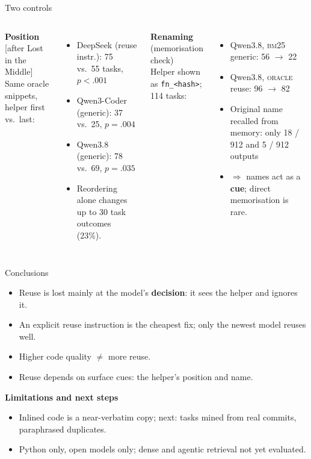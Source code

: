 \documentclass[aspectratio=169,11pt]{beamer}
\newcommand{\venue}[1]{{\scriptsize\color{gray}[#1]}}
\begin{document}
\begin{frame}{Two controls}
  \begin{columns}[T]
    \textbf{Position} \venue{after Lost in the Middle}\\[0.3em]
    {\small Same oracle snippets, helper first vs.\ last:}
    \begin{itemize}\small
      \item DeepSeek (reuse instr.): 75 vs.\ 55 tasks, $p<.001$
      \item Qwen3-Coder (generic): 37 vs.\ 25, $p=.004$
      \item Qwen3.8 (generic): 78 vs.\ 69, $p=.035$
      \item Reordering alone changes up to 30 task outcomes (23\%).
    \end{itemize}
    \textbf{Renaming} (memorisation check)\\[0.3em]
    {\small Helper shown as \texttt{fn\_<hash>}; 114 tasks:}
    \begin{itemize}\small
      \item Qwen3.8, \textsc{bm25} generic: 56 $\to$ 22
      \item Qwen3.8, \textsc{oracle} reuse: 96 $\to$ 82
      \item Original name recalled from memory: only 18 / 912 and 5 / 912 outputs
      \item $\Rightarrow$ names act as a \textbf{cue}; direct memorisation is rare.
    \end{itemize}
  \end{columns}
\end{frame}

\begin{frame}{Conclusions}
  \begin{itemize}
    \item Reuse is lost mainly at the model's \textbf{decision}: it sees the helper and ignores it.
    \item An explicit reuse instruction is the cheapest fix; only the newest model reuses well.
    \item Higher code quality $\neq$ more reuse.
    \item Reuse depends on surface cues: the helper's position and name.
  \end{itemize}
  \vspace{0.5em}
  \textbf{Limitations and next steps}
  \begin{itemize}\small
    \item Inlined code is a near-verbatim copy; next: tasks mined from real commits, paraphrased duplicates.
    \item Python only, open models only; dense and agentic retrieval not yet evaluated.
  \end{itemize}
\end{frame}
\end{document}
